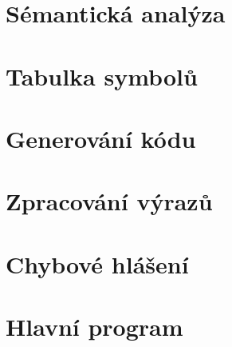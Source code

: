 \documentclass[11pt,a4paper]{article}
\renewcommand{\familydefault}{\sfdefault}
\begin{document}
        \renewcommand{\familydefault}{\sfdefault}

    \section{Sémantická analýza}


    \section{Tabulka symbolů}


    \section{Generování kódu}


    \section{Zpracování výrazů}


    \section{Chybové hlášení}


    \section{Hlavní program}
\end{document}
